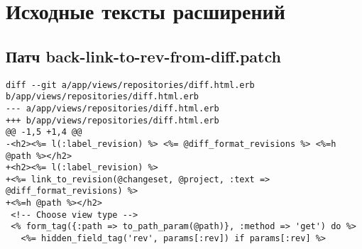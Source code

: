 \appendix

\makeatletter
\gdef\thechapter{\@Asbuk\c@chapter}
\makeatother

\chapter{Исходные тексты расширений}

\section{Патч back-link-to-rev-from-diff.patch}
\label{appendix:back-link-to-rev-from-diff.patch}
\begin{lstlisting}
diff --git a/app/views/repositories/diff.html.erb b/app/views/repositories/diff.html.erb
--- a/app/views/repositories/diff.html.erb
+++ b/app/views/repositories/diff.html.erb
@@ -1,5 +1,4 @@
-<h2><%= l(:label_revision) %> <%= @diff_format_revisions %> <%=h @path %></h2>
+<h2><%= l(:label_revision) %> 
+<%= link_to_revision(@changeset, @project, :text => @diff_format_revisions) %> 
+<%=h @path %></h2>
 <!-- Choose view type -->
 <% form_tag({:path => to_path_param(@path)}, :method => 'get') do %>
   <%= hidden_field_tag('rev', params[:rev]) if params[:rev] %>
\end{lstlisting}


